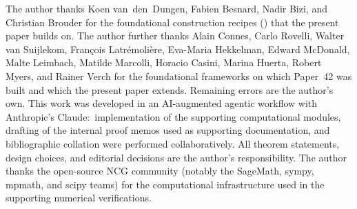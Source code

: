 \documentclass[11pt,a4paper]{article}
\theoremstyle{plain}
\theoremstyle{definition}
\begin{document}
The author thanks Koen van~den~Dungen, Fabien Besnard, Nadir Bizi, and
Christian Brouder for the foundational construction recipes
(\cite{vandungen2016, bizi_brouder_besnard2018}) that the present
paper builds on. The author further thanks
Alain Connes, Carlo Rovelli, Walter van Suijlekom, Fran\c{c}ois
Latr\'emoli\`ere, Eva-Maria Hekkelman, Edward McDonald, Malte Leimbach,
Matilde Marcolli, Horacio Casini, Marina Huerta, Robert Myers, and
Rainer Verch for the foundational frameworks on which Paper~42 was
built and which the present paper extends. Remaining errors are the
author's own. This work was developed in an AI-augmented agentic
workflow with Anthropic's Claude:\ implementation of the supporting
computational modules, drafting of the internal proof memos used as
supporting documentation, and bibliographic collation were performed
collaboratively. All theorem statements, design choices, and
editorial decisions are the author's responsibility. The author
thanks the open-source NCG community (notably the SageMath, sympy,
mpmath, and scipy teams) for the computational infrastructure used in
the supporting numerical verifications.
\end{document}
